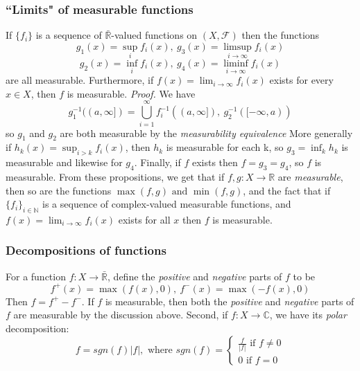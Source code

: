 \documentclass{article}
\begin{document}
\subsubsection{``Limits" of measurable functions}
If $\{f_i\}$ is a sequence of $\bar{\mathbb{R}}$-valued functions on $(X,\mathcal{F})$ then the functions 
\[
g_1(x) = \sup_if_i(x), \ g_3(x) = \limsup_{i \to \infty}f_i(x)
\]
\[
g_2(x)= \inf_if_i(x), \ g_4(x) = \liminf_{i\to\infty}f_i(x)
\]
are all measurable. Furthermore, if $f(x) = \lim_{i\to \infty}f_i(x)$ exists for every $x\in X$, then $f$ is measurable. \newline \newline 
\textit{Proof.} \newline \newline
We have 
\[
g_1^{-1}((a, \infty])= \bigcup_{i=1}^{\infty}f_i^{-1}((a,\infty]), \ g_2^{-1}([-\infty,a))
\]
so $g_1$ and $g_2$ are both measurable by the \emph{measurability equivalence}\newline \newline 
More generally  if $h_k(x)= \sup_{i>k }f_i(x)$, then $h_k$ is measurable for each k, so $g_3=\inf_kh_k$ is measurable and likewise for $g_4$. Finally, if $f$ exists then $f=g_3=g_4$, so $f$ is measurable. \newline \newline
From these propositions, we get that if $f,g:X\to \mathbb{R}$ are \emph{measurable}, then so are the functions $\max(f,g) \text{ and } \min(f,g)$, and the fact that if $\{f_i\}_{i\in\mathbb{N}}$ is a sequence of complex-valued measurable functions, and $f(x)=\lim_{i\to \infty}f_i(x)$ exists for all $x$ then $f$ is measurable.

\subsubsection{Decompositions of functions}
For a function $f:X \to \bar{\mathbb{R}}$, define the \emph{positive} and \emph{negative} parts of $f$ to be 
\[
f^+(x)=\max (f(x),0), \ f^-(x)=\max(-f(x),0)
\]
Then $f=f^+-f^-$. If $f$ is measurable, then both the  \emph{positive} and \emph{negative} parts of $f$ are measurable by the discussion above. Second, if $f:X\to \mathbb{C}$, we have its \emph{polar} decomposition:
\[
f= sgn(f)|f|, \text{ where }sgn(f) = \begin{cases}\frac{f}{|f|} \text{ if } f \neq 0 \\0 \text{ if } f = 0
    
\end{cases}
\]
\end{document}

